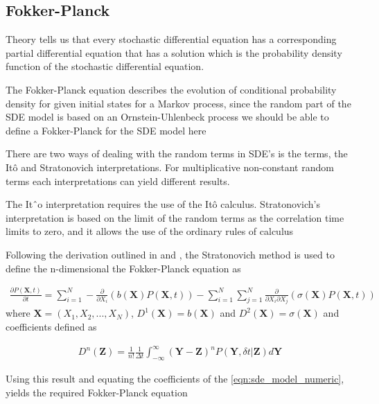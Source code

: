 \subsection{Fokker-Planck}\label{sec:der-sub}
Theory tells us that every stochastic differential equation has a corresponding partial differential equation that has a solution which is the probability density function of the stochastic differential equation.

The Fokker-Planck equation describes the evolution of conditional probability density for given initial states for a Markov process, since the random part of the SDE model is based on an Ornstein-Uhlenbeck process we should be able to 
define a Fokker-Planck for the SDE model here

There are two ways of dealing with the random terms in SDE's is the terms, the It\^o and Stratonovich interpretations. 
For multiplicative non-constant random terms each interpretations can yield different results.

The Itˆo interpretation requires the use of the It\^o calculus.  Stratonovich’s interpretation is based on the limit of the random terms
as the correlation time limits to zero, and it allows the use of the ordinary rules of calculus

Following the derivation outlined in \cite{risken} and \cite{hottovy}, the Stratonovich method is used to define the n-dimensional the Fokker-Planck equation as 

\begin{align}
 \frac{\partial P(\mathbf{X},t)}{\partial t} = \sum^{N}_{i=1}-\frac{\partial}{\partial X_{i}}(b(\mathbf{X})P(\mathbf{X},t)) - \sum^{N}_{i=1} \sum^{N}_{j=1} \frac{\partial}{\partial X_{i}\partial X_{j}}(\sigma(\mathbf{X})P(\mathbf{X},t))
\end{align}
where $\mathbf{X} = (X_1,X_2,...,X_N)$, $D^{1}(\mathbf{X}) = b(\mathbf{X})$ and $D^{2}(\mathbf{X}) = \sigma(\mathbf{X})$ and coefficients defined as 

\begin{align}
 D^{n}(\mathbf{Z}) = \frac{1}{n!}\frac{1}{\Delta t}\int^{\infty}_{-\infty}(\mathbf{Y} - \mathbf{Z})^{n}P(\mathbf{Y},\delta t | \mathbf{Z}) d \mathbf{Y}
\end{align}

Using this result and equating the coefficients of the \ref{eqn:sde_model_numeric}, yields the required Fokker-Planck equation




